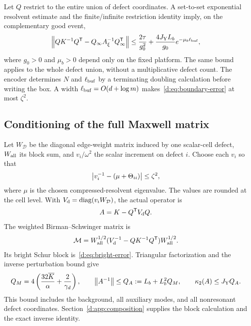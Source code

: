 Let $Q$ restrict to the entire union of defect coordinates. A set-to-set exponential resolvent estimate and the finite/infinite restriction identity imply, on the complementary good event,
\begin{equation}\label{d:eq:boundary-error}
 \left\lVert QK^{-1}Q^{\mathsf T}-Q_\infty A_\xi^{-1}Q_\infty^{\mathsf T}\right\rVert
 \le\frac{2\tau}{g_0^2}+\frac{4J_{\rm Y}L_b}{g_0}e^{-\mu_b\ell_{\rm buf}},
\end{equation}
where $g_0>0$ and $\mu_b>0$ depend only on the fixed platform. The same bound applies to the whole defect union, without a multiplicative defect count. The encoder determines $N$ and $\ell_{\rm buf}$ by a terminating doubling calculation before writing the box. A width $\ell_{\rm buf}=O(d+\log m)$ makes~\eqref{d:eq:boundary-error} at most $\zeta^2$.

\subsection{Conditioning of the full Maxwell matrix}

Let $W_{\mathcal D}$ be the diagonal edge-weight matrix induced by one scalar-cell defect, $W_{\rm all}$ its block sum, and $v_i/\omega^2$ the scalar increment on defect $i$. Choose each $v_i$ so that
\begin{equation}\label{d:eq:scalar-tuning}
 \left\lvert v_i^{-1}-(\mu+\Theta_{ii})\right\rvert\le\zeta^2,
\end{equation}
where $\mu$ is the chosen compressed-resolvent eigenvalue. The values are rounded at the cell level. With $V_{\rm d}=\operatorname{diag}(v_iW_{\mathcal D})$, the actual operator is
\begin{equation}\label{d:eq:assembled-A}
 A=K-Q^{\mathsf T}V_{\rm d}Q.
\end{equation}
The weighted Birman--Schwinger matrix is
\begin{equation}\label{d:eq:bs-matrix}
 \mathcal M=W_{\rm all}^{1/2}
       (V_{\rm d}^{-1}-QK^{-1}Q^{\mathsf T})W_{\rm all}^{1/2}.
\end{equation}
Its bright Schur block is~\eqref{d:eq:bright-error}. Triangular factorization and the inverse perturbation bound give
\begin{equation}\label{d:eq:full-inverse-budget}
 Q_M=4\left(\frac{32\overline K}{\alpha}+\frac2{\gamma_d}\right),\qquad
 \left\lVert A^{-1}\right\rVert\le Q_A:=L_b+L_b^2Q_M,
 \qquad \kappa_2(A)\le J_{\rm Y}Q_A.
\end{equation}
This bound includes the background, all auxiliary modes, and all nonresonant defect coordinates. Section~\ref{d:app:composition} supplies the block calculation and the exact inverse identity.

